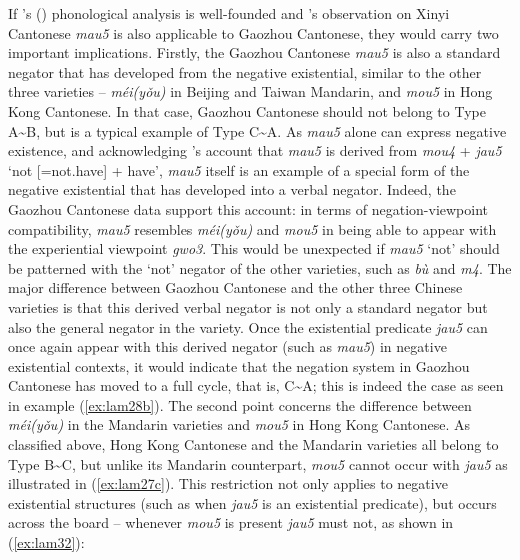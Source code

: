 \documentclass[output=paper,colorlinks,citecolor=brown,chinesefont]{langscibook}
\begin{document}
If \citeauthor{Law2014}'s (\citeyear{Law2014}) phonological analysis is well-founded and \citeauthor{Zhang2002}'s observation on Xinyi Cantonese \textit{mau5} is also applicable to Gaozhou Cantonese, they would carry two important implications. Firstly, the Gaozhou Cantonese \textit{mau5} is also a standard negator that has developed from the negative existential, similar to the other three varieties – \textit{méi(yǒu)} in Beijing and Taiwan Mandarin, and \textit{mou5} in Hong Kong Cantonese. In that case, Gaozhou Cantonese should not belong to Type A\sim B, but is a typical example of Type C\sim A. As \textit{mau5} alone can express negative existence, and acknowledging \citeauthor{Zhang2002}'s account that \textit{mau5} is derived from \textit{mou4} + \textit{jau5} `not [=not.have] + have',  \textit{mau5} itself is an example of a special form of the negative existential that has developed into a verbal negator. Indeed, the Gaozhou Cantonese data support this account: in terms of negation-viewpoint compatibility, \textit{mau5} resembles \textit{méi(yǒu)} and \textit{mou5} in being able to appear with the experiential viewpoint \textit{gwo3}. This would be unexpected if \textit{mau5} `not' should be patterned with the `not' negator of the other varieties, such as \textit{bù} and \textit{m4}. The major difference between Gaozhou Cantonese and the other three Chinese varieties is that this derived verbal negator is not only a standard negator but also the general negator in the variety. Once the existential predicate \textit{jau5} can once again appear with this derived negator (such as \textit{mau5}) in negative existential contexts, it would indicate that the negation system in Gaozhou Cantonese has moved to a full cycle, that is, C\sim A; this is indeed the case as seen in example (\ref{ex:lam28b}). The second point concerns the difference between \textit{méi(yǒu)} in the Mandarin varieties and \textit{mou5} in Hong Kong Cantonese. As classified above, Hong Kong Cantonese and the Mandarin varieties all belong to Type B\sim C, but unlike its Mandarin counterpart, \textit{mou5} cannot occur with \textit{jau5} as illustrated in (\ref{ex:lam27c}). This restriction not only applies to negative existential structures (such as when \textit{jau5} is an existential predicate), but occurs across the board – whenever \textit{mou5} is present \textit{jau5} must not, as shown in (\ref{ex:lam32}): 
\end{document}

